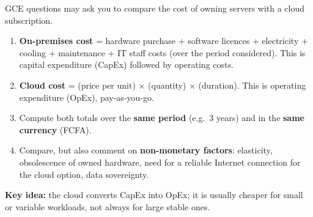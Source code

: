 \documentclass[11pt]{article}
\newcommand{\cle}[1]{{\popxbold\color{popdark}#1}}
\begin{document}
\begin{methode}
GCE questions may ask you to compare the cost of owning servers with a cloud subscription.
\begin{enumerate}
\item \textbf{On-premises cost} = hardware purchase + software licences + electricity + cooling + maintenance + IT staff costs (over the period considered). This is capital expenditure (\cle{CapEx}) followed by operating costs.
\item \textbf{Cloud cost} = (price per unit) $\times$ (quantity) $\times$ (duration). This is operating expenditure (\cle{OpEx}), pay-as-you-go.
\item Compute both totals over the \textbf{same period} (e.g.\ 3 years) and in the \textbf{same currency} (FCFA).
\item Compare, but also comment on \textbf{non-monetary factors}: elasticity, obsolescence of owned hardware, need for a reliable Internet connection for the cloud option, data sovereignty.
\end{enumerate}
\textbf{Key idea:} the cloud converts CapEx into OpEx; it is usually cheaper for small or variable workloads, not always for large stable ones.
\end{methode}
\end{document}
